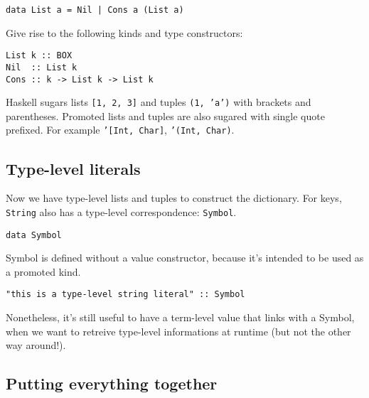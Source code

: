 \documentclass[pldi]{sigplanconf-pldi16}
\begin{document}
\begin{verbatim}
data List a = Nil | Cons a (List a)
\end{verbatim}

Give rise to the following kinds and type constructors:\footnotemark\footnotemark


\begin{verbatim}
List k :: BOX
Nil  :: List k
Cons :: k -> List k -> List k
\end{verbatim}

Haskell sugars lists \texttt{[1, 2, 3]} and
tuples \texttt{(1, 'a')} with brackets and parentheses.
Promoted lists and tuples are also sugared with single quote prefixed. For
example \texttt{'}\texttt{[Int, Char]},
\texttt{'}\texttt{(Int, Char)}.

\subsection{Type-level literals}

Now we have type-level lists and tuples to construct the dictionary.
For keys, \texttt{String} also has a type-level correspondence:
\texttt{Symbol}.

\begin{verbatim}
data Symbol
\end{verbatim}

Symbol is defined without a value constructor, because it's
intended to be used as a promoted kind.

\begin{verbatim}
"this is a type-level string literal" :: Symbol
\end{verbatim}

Nonetheless, it's still useful to have a term-level value that links with a
Symbol, when we want to retreive type-level informations at runtime (but not the
 other way around!).

\subsection{Putting everything together}
\end{document}
